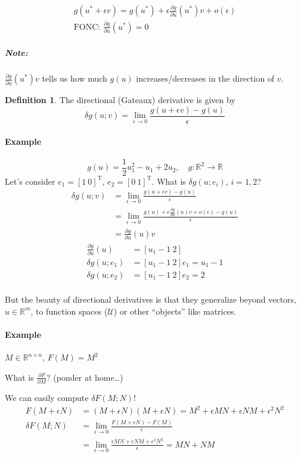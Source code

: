 \documentclass[letterpaper,12pt,titlepage]{report}
\newcommand{\trans}{^\text{T}}
\newcommand*\pder[2]{\frac{\partial #1}{\partial #2}}
\newcommand*\R{\mathbb{R}}
\theoremstyle{plain}
\theoremstyle{definition}
\newtheorem*{defi}{Definition}
\begin{document}
\begin{gather}
  g(u^* + \epsilon v) = g(u^*) + \epsilon \pder{g}{u}(u^*) v + o(\epsilon) \\
  \text{FONC: } \pder{g}{u}(u^*) = 0 \hspace{3cm} 
\end{gather}

\subparagraph{Note:} $\pder{g}{u}(u^*) v$ tells us how much $g(u)$ increases/decreases in the direction of $v$.

\begin{defi}
  The directional (Gateaux) derivative is given by
  \[ \delta g(u;v) = \lim_{\epsilon\to0} \frac{g(u+\epsilon v)-g(u)}{\epsilon} \]
\end{defi}

\paragraph{Example}
\[ g(u) = \frac12 u_1^2 - u_1 + 2u_2, \quad g:\R^2\to\R \]
Let's consider $e_1=[1\ 0]\trans$, $e_2=[0\ 1]\trans$. What is $\delta g(u;e_i)$, $i=1,2$?
\begin{align}
  \delta g(u;v) &= \lim_{\epsilon\to0} \frac{g(u+\epsilon v)-g(u)}{\epsilon} \\
                &= \lim_{\epsilon\to0} \frac{g(u)+\epsilon\pder{g}{u}(u) v + o(\epsilon) - g(u)}{\epsilon} \\
                &= \pder{g}{u} (u) v
\end{align}
\begin{align}
  \pder{g}{u}(u) &= [u_1-1\ 2] \\
  \delta g(u;e_1) &= [u_1-1\ 2] e_1 = u_1-1 \\
  \delta g(u;e_2) &= [u_1-1\ 2] e_2 = 2 \\
\end{align}

But the beauty of directional derivatives is that they generalize beyond vectors, $u\in\R^m$, to function spaces ($\mathcal U$) or other ``objects'' like matrices.

\paragraph{Example} $M\in\R^{n\times n}$, $F(M)=M^2$

What is $\pder{F}{M}$? (ponder at home\dots)

We can easily compute $\delta F(M;N)$!
\begin{align}
  F(M+\epsilon N) &= (M+\epsilon N)(M+\epsilon N) = M^2 + \epsilon M N + \epsilon N M + \epsilon^2 N^2 \\
  \delta F(M;N) &= \lim_{\epsilon\to0} \frac{F(M+\epsilon N)-F(M)}{\epsilon} \\
                  &= \lim_{\epsilon\to0} \frac{\epsilon M N + \epsilon N M + \epsilon^2 N^2}{\epsilon} = MN + NM
\end{align}
\end{document}
